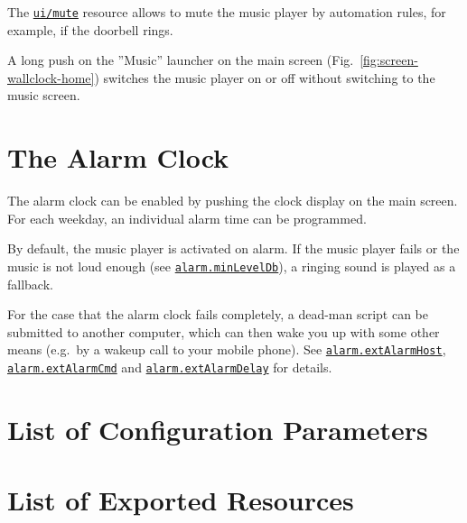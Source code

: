\documentclass[12pt,english,parskip=half]{scrreprt}
\newcommand{\idx}[1]{#1\index{#1}}
\newcommand{\envref}[1]{\hyperref[env:#1]{\texttt{#1}}}        %
\newcommand{\rcref}[1]{\hyperref[rc:#1]{\texttt{#1}}}
\begin{document}
The \rcref{ui/mute} resource allows to mute the music player by automation
rules, for example, if the doorbell rings.

A long push on the ''Music'' launcher on the main screen (Fig.~\ref{fig:screen-wallclock-home})
switches the music player on or off without switching to the music screen.





\section{The Alarm Clock}
\label{sec:wallclock-alarmclock}

The alarm clock can be enabled by pushing the clock display on the main screen.
For each weekday, an individual alarm time can be programmed.

By default, the music player is activated on alarm. If the music player fails
or the music is not loud enough (see \envref{alarm.minLevelDb}), a ringing
sound is played as a fallback.

For the case that the alarm clock fails completely, a dead-man script can
be submitted to another computer, which can then wake you up with some
other means (e.g.~by a wakeup call to your mobile phone).
See \envref{alarm.extAlarmHost}, \envref{alarm.extAlarmCmd} and \envref{alarm.extAlarmDelay}
for details.





\section{List of Configuration Parameters}
\label{sec:wallclock-env}




\section{List of Exported Resources}
\label{sec:wallclock-rc}
\end{document}
